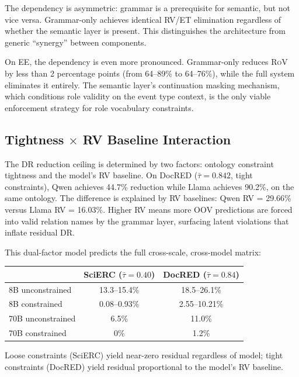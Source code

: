 \documentclass[11pt,a4paper]{article}
\newcommand{\drsym}{\textsc{DR}}
\newcommand{\rvsym}{\textsc{RV}}
\newcommand{\etsym}{\textsc{ET}}
\newcommand{\rovsym}{\textsc{RoV}}
\begin{document}
The dependency is asymmetric: grammar is a prerequisite for semantic, but not vice versa. Grammar-only achieves identical \rvsym{}/\etsym{} elimination regardless of whether the semantic layer is present. This distinguishes the architecture from generic ``synergy'' between components.

On EE, the dependency is even more pronounced. Grammar-only reduces \rovsym{} by less than 2 percentage points (from 64--89\% to 64--76\%), while the full system eliminates it entirely. The semantic layer's continuation masking mechanism, which conditions role validity on the event type context, is the only viable enforcement strategy for role vocabulary constraints.

\subsection{Tightness $\times$ RV Baseline Interaction}
\label{sec:analysis-tightness}

The \drsym{} reduction ceiling is determined by two factors: ontology constraint tightness and the model's \rvsym{} baseline. On DocRED ($\bar{\tau}=0.842$, tight constraints), Qwen achieves 44.7\% reduction while Llama achieves 90.2\%, on the same ontology. The difference is explained by \rvsym{} baselines: Qwen \rvsym{} = 29.66\% versus Llama \rvsym{} = 16.03\%. Higher \rvsym{} means more OOV predictions are forced into valid relation names by the grammar layer, surfacing latent violations that inflate residual \drsym{}.

This dual-factor model predicts the full cross-scale, cross-model matrix:

\begin{table}[h]
\centering
\small
\begin{tabular}{lcc}
\toprule
& SciERC ($\bar{\tau}=0.40$) & DocRED ($\bar{\tau}=0.84$) \\
\midrule
8B unconstrained & 13.3--15.4\% & 18.5--26.1\% \\
8B constrained & 0.08--0.93\% & 2.55--10.21\% \\
70B unconstrained & 6.5\% & 11.0\% \\
70B constrained & 0\% & 1.2\% \\
\bottomrule
\end{tabular}
\end{table}

Loose constraints (SciERC) yield near-zero residual regardless of model; tight constraints (DocRED) yield residual proportional to the model's \rvsym{} baseline.
\end{document}
